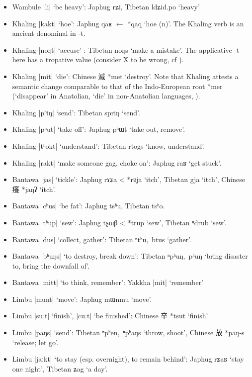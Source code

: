 \documentclass[oneside,a4paper,11pt]{article}
\newcommand{\ipa}[1]{{\phon\mbox{#1}}} %
\newcommand{\zh}[1]{{\cn #1}}
\newcommand{\dhatu}[2]{|\ipa{#1}| `#2'}
\begin{document}
\begin{itemize}
\item Wambule \dhatu{li}{be heavy}: Japhug \ipa{rʑi}, Tibetan \ipa{ldʑid.po} `heavy'
\item Khaling \dhatu{kakt}{hoe}: Japhug \ipa{qaʁ} $\leftarrow$ *\ipa{qaq} `hoe (n)'. The Khaling verb is an ancient denominal in \ipa{-t}.
\item Khaling \dhatu{noŋt}{accuse} : Tibetan \ipa{noŋs} `make a mistake'. The applicative \ipa{-t} here has a tropative value (consider X to be wrong, cf \citealt{jacques13tropative}).
\item Khaling \dhatu{mit}{die}: Chinese \zh{滅} *\ipa{met} `destroy'. Note that Khaling attests a semantic change comparable to that of the Indo-European root *\ipa{mer} (`disappear' in Anatolian, `die' in non-Anatolian languages, \citealt[439-440]{liv}).
\item Khaling \dhatu{pʰiŋ}{send}: Tibetan \ipa{spriŋ} `send'.
\item Khaling \dhatu{pʰut}{take off}: Japhug \ipa{pʰɯt} `take out, remove'.
\item Khaling \dhatu{tʰokt}{understand}: Tibetan \ipa{rtogs} `know, understand'.
\item Khaling \dhatu{rakt}{make someone gag, choke on}: Japhug \ipa{raʁ} `get stuck'.
\item Bantawa \dhatu{jas}{tickle}: Japhug \ipa{rɤʑa} < *\ipa{rɐja} `itch', Tibetan \ipa{gja} `itch', Chinese \zh{癢} *\ipa{jaŋʔ} `itch'.
\item Bantawa \dhatu{cʰus}{be fat}: Japhug \ipa{tsʰu}, Tibetan \ipa{tsʰo}.
\item Bantawa \dhatu{tʰup}{sew}: Japhug \ipa{tʂɯβ} < *\ipa{trup} `sew', Tibetan \ipa{ⁿdrub} `sew'.
\item Bantawa \dhatu{dus}{collect, gather}: Tibetan \ipa{ⁿtʰu, btus} `gather'.
\item Bantawa \dhatu{bʰuŋs}{to destroy, break down}: Tibetan \ipa{ⁿpʰuŋ, pʰuŋ} `bring disaster to, bring the downfall of'.
\item Bantawa \dhatu{mitt}{to think, remember}: Yakkha \dhatu{mit}{remember}
\item Limbu \dhatu{munt}{move}: Japhug \ipa{mɯnmu} `move'.
\item Limbu \dhatu{suːt}{finish}, \dhatu{cuːt}{be finished}: Chinese \zh{卒} *\ipa{tsut} `finish'.
\item Limbu \dhatu{paŋs}{send}: Tibetan \ipa{ⁿpʰen, ⁿpʰaŋs} `throw, shoot', Chinese \zh{放} *\ipa{paŋ-s} `release; let go'.
\item Limbu \dhatu{jaːkt}{to stay (esp. overnight), to remain behind}: Japhug \ipa{rʑaʁ} `stay one night', Tibetan \ipa{ʑag} `a day'.

\end{itemize}
\end{document}
